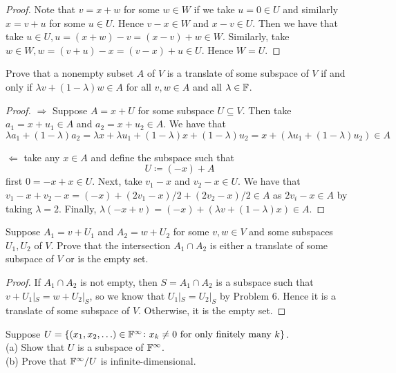 \documentclass{extarticle}
\begin{document}
\begin{proof}
Note that \(v = x + w\) for some \(w \in W\) if we take \(u = 0 \in U\) and similarly 
\(x = v + u\) for some \(u \in U\). Hence \(v - x \in W\) and \(x - v \in U\). Then we 
have that take \(u \in U, u = (x + w) - v = (x - v) + w \in W\). Similarly, take 
\(w \in W, w = (v + u) - x = (v - x) + u \in U\). Hence \(W = U\). 
\end{proof}

\begin{problem}{9}
    Prove that a nonempty subset \(A\) of \(V\) is a translate of some subspace of \(V\) if and only 
    if \(\lambda v + (1 - \lambda) w \in A\) for all \(v, w \in A\) and all \(\lambda \in \mathbb{F}\). 
\end{problem}

\begin{proof}
\(\Rightarrow\) Suppose \(A = x + U\) for some subspace \(U \subseteq V\). Then take 
\(a_1 = x + u_1 \in A\) and \(a_2 = x + u_2 \in A\). We have that 
\[\lambda a_1 + (1 - \lambda) a_2 = \lambda x + \lambda u_1 + (1 - \lambda)x + (1 - \lambda)u_2 
= x + (\lambda u_1 + (1 - \lambda)u_2) \in A\]

\(\Leftarrow\) take any \(x \in A\) and define the subspace such that 
\[U \coloneq (-x) + A\]
first \(0 = -x + x \in U\). Next, take \(v_1 - x\) and \(v_2 - x \in U\). We have that 
\(v_1 - x + v_2 - x = (-x) + (2v_1 - x)/2 + (2v_2 - x)/2 \in A\) as \(2v_i - x \in A\)
by taking \(\lambda = 2\). Finally, \(\lambda (-x + v) = (-x) + (\lambda v + (1 - \lambda) x) \in A\). 
\end{proof}

\begin{problem}{10}
    Suppose \(A_1 = v + U_1\) and \(A_2 = w + U_2\) for some \(v, w \in V\) and some subspaces 
    \(U_1, U_2\) of \(V\). Prove that the intersection \(A_1 \cap A_2\) is either a translate of 
    some subspace of \(V\) or is the empty set. 
\end{problem}

\begin{proof}
If \(A_1 \cap A_2\) is not empty, then \(S = A_1 \cap A_2\) is a subspace such that \(v + U_1|_S = w + U_2|_S\),
so we know that \(U_1 |_S = U_2 |_S\) by Problem 6. Hence it is a translate of some subspace of \(V\). Otherwise,
it is the empty set. 
\end{proof}

\begin{problem}{11}
    Suppose \(U = \{(x_1, x_2, \ldots) \in \mathbb{F}^\infty \colon x_k \neq 0 \text{ for only finitely many }k\}\).\\ 
    (a) Show that \(U\) is a subspace of \(\mathbb{F}^\infty\). \\ 
    (b) Prove that \(\mathbb{F}^\infty / U\) is infinite-dimensional. 
\end{problem}
\end{document}

